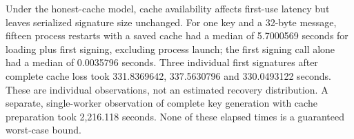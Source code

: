 Under the honest-cache model, cache availability affects first-use latency but leaves serialized signature size unchanged. For one key and a 32-byte message, fifteen process restarts with a saved cache had a median of 5.7000569 seconds for loading plus first signing, excluding process launch; the first signing call alone had a median of 0.0035796 seconds. Three individual first signatures after complete cache loss took 331.8369642, 337.5630796 and 330.0493122 seconds. These are individual observations, not an estimated recovery distribution. A separate, single-worker observation of complete key generation with cache preparation took 2,216.118 seconds. None of these elapsed times is a guaranteed worst-case bound.


